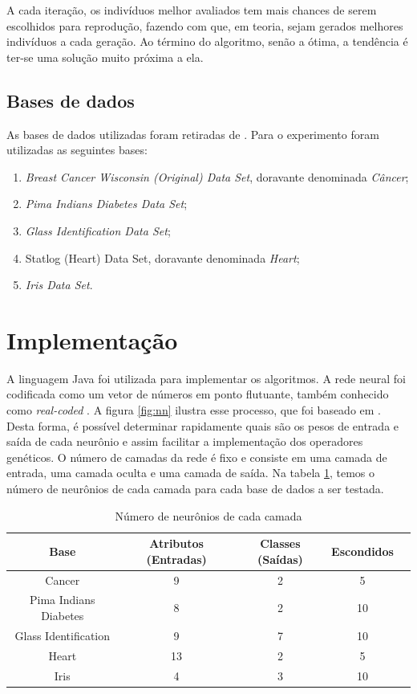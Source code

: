 \documentclass[12pt]{article}
\begin{document}
\par A cada iteração, os indivíduos melhor avaliados tem mais chances de serem escolhidos para reprodução, fazendo com que, em teoria, sejam gerados melhores indivíduos a cada geração. Ao término do algoritmo, senão a ótima, a tendência é ter-se uma solução muito próxima a ela.


\subsection{Bases de dados}

\par As bases de dados utilizadas foram retiradas de \cite{frank}. Para o experimento foram utilizadas as seguintes bases:

\begin{enumerate}
	\item \textit{Breast Cancer Wisconsin (Original) Data Set}, doravante denominada \textit{Câncer};
	\item \textit{Pima Indians Diabetes Data Set};
	\item \textit{Glass Identification Data Set};
	\item Statlog (Heart) Data Set, doravante denominada \textit{Heart};
	\item \textit{Iris Data Set}.
\end{enumerate}


\section{Implementação}\label{sec:imple}

\par A linguagem Java foi utilizada para implementar os algoritmos. A rede neural foi codificada como um vetor de números em ponto flutuante, também conhecido como \textit{real-coded} \cite{Liu}. A figura \ref{fig:nn} ilustra esse processo, que foi baseado em \cite{montana}. Desta forma, é possível determinar rapidamente quais são os pesos de entrada e saída de cada neurônio e assim facilitar a implementação dos o\-pe\-ra\-do\-res genéticos. O número de camadas da rede é fixo e consiste em uma camada de entrada, uma camada oculta e uma camada de saída. Na tabela \ref{tab:params}, temos o número de neurônios de cada camada para cada base de dados a ser testada.

\begin{table}[h]
	\center
	\begin{tabular}{|c|c|c|c|c|}
		\hline Base  & Atributos (Entradas) & Classes (Saídas) & Escondidos \\ 
		\hline Cancer & 9 & 2 & 5 \\ 
		\hline Pima Indians Diabetes & 8 & 2 & 10 \\ 
		\hline Glass Identification & 9 & 7 & 10 \\ 
		\hline Heart & 13 & 2 & 5 \\ 
		\hline Iris & 4 & 3 & 10 \\ 
		\hline 
	\end{tabular}
	\caption{Número de neurônios de cada camada}
	\label{tab:params}
\end{table} 
\end{document}
